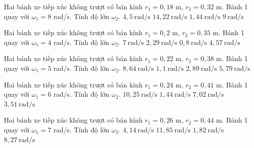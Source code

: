 \begin{ex}
Hai bánh xe tiếp xúc không trượt có bán kính $r_1=0,18$ m, $r_2=0,32$ m. Bánh 1 quay với $\omega_1=8$ rad/s. Tính độ lớn $\omega_2$.
\choice
{\True $4,5\ \mathrm{rad/s}$}
{$14,22\ \mathrm{rad/s}$}
{$1,44\ \mathrm{rad/s}$}
{$9\ \mathrm{rad/s}$}
\end{ex}

\begin{ex}
Hai bánh xe tiếp xúc không trượt có bán kính $r_1=0,2$ m, $r_2=0,35$ m. Bánh 1 quay với $\omega_1=4$ rad/s. Tính độ lớn $\omega_2$.
\choice
{$7\ \mathrm{rad/s}$}
{\True $2,29\ \mathrm{rad/s}$}
{$0,8\ \mathrm{rad/s}$}
{$4,57\ \mathrm{rad/s}$}
\end{ex}

\begin{ex}
Hai bánh xe tiếp xúc không trượt có bán kính $r_1=0,22$ m, $r_2=0,38$ m. Bánh 1 quay với $\omega_1=5$ rad/s. Tính độ lớn $\omega_2$.
\choice
{$8,64\ \mathrm{rad/s}$}
{$1,1\ \mathrm{rad/s}$}
{\True $2,89\ \mathrm{rad/s}$}
{$5,79\ \mathrm{rad/s}$}
\end{ex}

\begin{ex}
Hai bánh xe tiếp xúc không trượt có bán kính $r_1=0,24$ m, $r_2=0,41$ m. Bánh 1 quay với $\omega_1=6$ rad/s. Tính độ lớn $\omega_2$.
\choice
{$10,25\ \mathrm{rad/s}$}
{$1,44\ \mathrm{rad/s}$}
{$7,02\ \mathrm{rad/s}$}
{\True $3,51\ \mathrm{rad/s}$}
\end{ex}

\begin{ex}
Hai bánh xe tiếp xúc không trượt có bán kính $r_1=0,26$ m, $r_2=0,44$ m. Bánh 1 quay với $\omega_1=7$ rad/s. Tính độ lớn $\omega_2$.
\choice
{\True $4,14\ \mathrm{rad/s}$}
{$11,85\ \mathrm{rad/s}$}
{$1,82\ \mathrm{rad/s}$}
{$8,27\ \mathrm{rad/s}$}
\end{ex}


